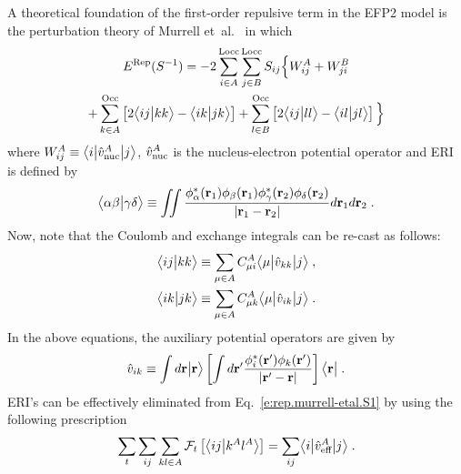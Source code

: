 A theoretical foundation of the
first\hyp{}order repulsive term in the EFP2 model
is the perturbation theory of
Murrell et~al.~\cite{Murrell.Randic.Williams.Longuet-Higgins.ProcRSocLondA.1965} 
in which
%
\begin{multline} \label{e:rep.murrell-etal.S1}
    E^{\rm Rep}(S^{-1}) = -2\sum_{i\in A}^{\rm Locc} \sum_{j\in B}^{\rm Locc}
               S_{ij} \Big\{
           W^A_{ij} 
         + W^B_{ji} \\
 + \sum_{k\in A}^{\rm Occ} \left[ 2\BraKet{ij}{kk} - \BraKet{ik}{jk} \right] 
 + \sum_{l\in B}^{\rm Occ} \left[ 2\BraKet{ij}{ll} - \BraKet{il}{jl} \right]
                \Big\}
\end{multline}
%
where $W^A_{ij} \equiv \tBraKet{i}{\hat{v}^A_{\rm nuc}}{j}$,
$\hat{v}^A_{\rm nuc}$
is the nucleus\hyp{}electron potential operator
and
ERI is defined by
%
\begin{equation} \label{e:eri}
	\BraKet{\alpha\beta}{\gamma\delta} \equiv
	\iint 
	\frac{ \phi_\alpha^{*}({\bf r}_1) \phi_\beta({\bf r}_1) 
	       \phi_\gamma^{*}({\bf r}_2) \phi_\delta({\bf r}_2) }{ \vert {\bf r}_1 - {\bf r}_2 \vert}
	d{\bf r}_1 d{\bf r}_2  \;.
\end{equation}
%
Now, note that the Coulomb and exchange integrals can be re\hyp{}cast as follows:
%
\begin{subequations}
 \begin{align}
 \BraKet{ij}{kk} &\equiv \sum_{\mu\in A} 
     C_{\mu i}^A \tBraKet{\mu}{\hat{v}_{kk}}{j} \;, \\
 \BraKet{ik}{jk} &\equiv \sum_{\mu\in A} 
     C_{\mu k}^A \tBraKet{\mu}{\hat{v}_{ik}}{j} \;.
 \end{align}
\end{subequations}
%
%
%
In the above equations, the auxiliary potential operators are given by
%
\begin{equation}
  \hat{v}_{ik} \equiv \int d{\bf r} \Ket{{\bf r}} 
        \left[
        \int d{\bf r}' \frac{\phi_i^{*}({\bf r}') \phi_k({\bf r}')}{\vert {\bf r}' - {\bf r}\vert}
        \right] \Bra{{\bf r}} \;.
\end{equation}
%
ERI's can be effectively eliminated from Eq.~\eqref{e:rep.murrell-etal.S1} 
by using the following prescription~\cite{Blasiak.Bednarska.Choluj.Bartkowiak.JCP.2019}
%
\begin{equation} \label{e:ft-reduction}
	\sum_t \sum_{ij}\sum_{kl\in A} {\mathcal{F}}_t\left[ 
   \BraKet{ij}{k^Al^A}
 \right] = \sum_{ij} \tBraKet{i}{\hat{v}_{\text{eff}}^A}{j} \;.
\end{equation}
